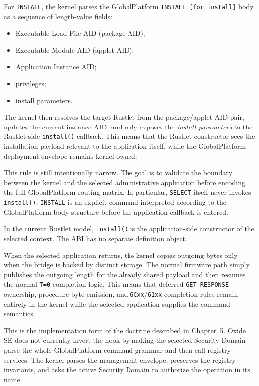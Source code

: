 For \texttt{INSTALL}, the kernel parses the
GlobalPlatform \texttt{INSTALL [for install]} body as a sequence of
length-value fields:
\begin{itemize}
\item Executable Load File AID (package AID);
\item Executable Module AID (applet AID);
\item Application Instance AID;
\item privileges;
\item install parameters.
\end{itemize}

The kernel then resolves the target Rustlet from the package/applet AID
pair, updates the current instance AID, and only exposes the
\emph{install parameters} to the Rustlet-side \texttt{install()}
callback. This means that the Rustlet constructor sees the installation
payload relevant to the application itself, while the GlobalPlatform
deployment envelope remains kernel-owned.

This rule is still intentionally narrow. The goal is to validate the
boundary between the kernel and the selected administrative application
before encoding the full GlobalPlatform routing matrix. In particular,
\texttt{SELECT} itself never invokes \texttt{install()}; \texttt{INSTALL}
is an explicit command interpreted according to the GlobalPlatform body
structure before the
application callback is entered.

In the current Rustlet model, \texttt{install()} is the application-side
constructor of the selected context. The ABI has no separate definition
object.

When the selected application returns, the kernel copies outgoing bytes only
when the bridge is backed by distinct storage. The normal firmware path simply
publishes the outgoing length for the already shared payload and then resumes
the normal \texttt{T=0} completion logic. This means that deferred
\texttt{GET RESPONSE} ownership, procedure-byte emission, and
\texttt{6Cxx}/\texttt{61xx} completion rules remain entirely in the
kernel while the selected application supplies the command semantics.

This is the implementation form of the doctrine described in
Chapter~5. Oxide SE does not currently invert the hook by making the selected
Security Domain parse the whole GlobalPlatform command grammar and then call
registry services. The kernel parses the management envelope, preserves the
registry invariants, and asks the active Security Domain to authorize the
operation in its name.


